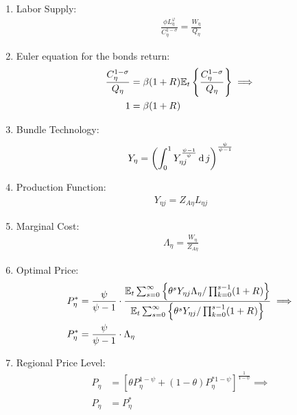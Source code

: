 \documentclass[../thesis.tex]{subfiles}
\begin{document}
\begin{enumerate}
	\item Labor Supply:
	\begin{align}
		\frac{\phi L_{\eta}^{\varphi}}{C_{\eta}^{1-\sigma}} = \frac{W_{\eta}}{Q_{\eta}} \label{eq_v5:reg-ss-labor-supply}
	\end{align}
	
	\item Euler equation for the bonds return:
	\begin{align}
		\frac{C_{\eta}^{1-\sigma}}{Q_{\eta}} &= \beta (1 + R_{}) {\mathbb{E}_{t}} \left\{ \frac{C_{\eta}^{1-\sigma}}{Q_{\eta}} \right\} \implies \nonumber \\ 
		1 &= \beta (1 + R_{}) \label{eq_v5:reg-ss-bonds-euler-equation}
	\end{align}
	
	\item Bundle Technology:
	\begin{align}
		Y_{\eta} = \left( \int_{0}^{1} Y_{\eta j}^{\frac{\psi-1}{\psi}} \operatorname{d} j \right)^{\frac{\psi}{\psi-1}} \label{eq_v5:reg-ss-final-goods-firm-bundle-rule}
	\end{align}
	
	\item Production Function:
	\begin{align}
		Y_{\eta j} = Z_{A\eta} L_{\eta j} \label{eq_v5:reg-ss-int-good-firm-production-function}
	\end{align}
	
	\item Marginal Cost:
	\begin{align}
		\Lambda_{\eta} = \frac{W_{\eta}}{Z_{A\eta}} \label{eq_v5:reg-ss-int-good-firm-FOC-L}
	\end{align}
	
	\item Optimal Price:
	\begin{align}
		P_{\eta}^{\ast} &= \frac{\psi}{\psi-1} \cdot \frac{ {\mathbb{E}_{t}} \sum_{s=0}^{\infty} \left\{ \theta^s Y_{\eta j} \Lambda_{\eta} / \prod_{k=0}^{s-1}(1+R_{}) \right\}} {{\mathbb{E}_{t}} \sum_{s=0}^{\infty} \left\{ \theta^s Y_{\eta j} / \prod_{k=0}^{s-1}(1 + R_{}) \right\}} \implies \nonumber \\
		P_{\eta}^{\ast} &= \frac{\psi}{\psi-1} \cdot \Lambda_{\eta} \label{eq_v5:reg-ss-int-good-firm-optimal-price-FOC-3}
	\end{align}
	
	\item Regional Price Level:
	\begin{align}
		P_{\eta} &= \left[ \theta P_{\eta}^{1-\psi} + (1-\theta) P_{\eta}^{\ast 1-\psi} \right]^\frac{1}{1-\psi} \implies \nonumber \\
		P_{\eta} &= P_{\eta}^{\ast} \label{eq_v5:reg-ss-general-price-level}
	\end{align}
	

\end{enumerate}
\end{document}
